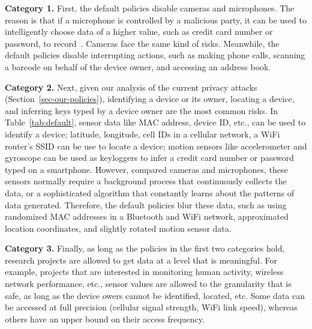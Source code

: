 \textbf{Category 1.}
First, the default policies disable cameras and microphones. The reason is 
that if a microphone is controlled by a malicious party, it can be used to 
intelligently choose data of a higher value, such as credit card number or 
password, to record~\cite{zhang2015leave}. Cameras face the same kind 
of risks. Meanwhile, the default policies disable interrupting actions, such as 
making phone calls, scanning a barcode on behalf of the device owner, 
and accessing an address book. 

\textbf{Category 2.}
Next, given our analysis of the current privacy attacks 
(Section~\ref{sec-our-policies}), identifying a device or its owner, locating 
a device, and inferring keys typed by a device owner are the most
common risks. In Table~\ref{tab:default}, sensor data like MAC address, 
device ID, etc., can be used to identify a device; latitude, longitude, cell 
IDs in a cellular network, a WiFi router's SSID can be use to locate a 
device; motion sensors like accelerometer and gyroscope can be used
as keyloggers to infer a credit card number or password typed on a 
smartphone. However, compared cameras and microphones, these 
sensors normally require a background process that continuously 
collects the data, or a sophisticated algorithm that constantly learns 
about the patterns of data generated. Therefore, the default policies 
blur these data, such as using randomized MAC addresses in a 
Bluetooth and WiFi network, approximated location coordinates, and 
slightly rotated motion sensor data. 

\textbf{Category 3.}
Finally, as long as the policies in the first two categories hold, research 
projects are allowed to get data at a level that is meaningful. For example, 
projects that are interested in monitoring human activity, wireless network 
performance, etc., sensor values are allowed to the granularity that is safe, 
as long as the device owers cannot be identified, located, etc. Some data 
can be accessed at full precision (cellular signal strength, WiFi link speed), 
whereas others have an upper bound on their access frequency. 

